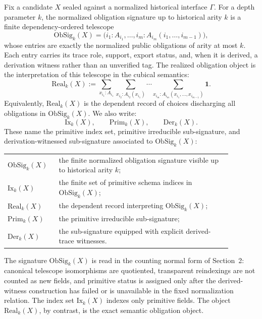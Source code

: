 \documentclass{lmcs}
\begin{document}
\begin{defi}
\label{def:obsig-real}
Fix a candidate \(X\) sealed against a normalized historical interface \(\Gamma\).  For a
depth parameter \(k\), the normalized obligation signature up to historical arity \(k\) is a
finite dependency-ordered telescope
\[
  \mathrm{ObSig}_k(X)
  =
  \bigl(i_1:A_{i_1},\ldots,i_m:A_{i_m}(i_1,\ldots,i_{m-1})\bigr),
\]
whose entries are exactly the normalized public obligations of arity at most \(k\).  Each
entry carries its trace role, support, export status, and, when it is derived, a derivation
witness rather than an unverified tag.  The realized obligation object is the interpretation of
this telescope in the cubical semantics:
\[
  \mathrm{Real}_k(X)
  :=
  \sum_{x_{i_1}:A_{i_1}}
  \sum_{x_{i_2}:A_{i_2}(x_{i_1})}
  \cdots
  \sum_{x_{i_m}:A_{i_m}(x_{i_1},\ldots,x_{i_{m-1}})}
  \mathbf{1}.
\]
Equivalently, \(\mathrm{Real}_k(X)\) is the dependent record of choices discharging all
obligations in \(\mathrm{ObSig}_k(X)\).  We also write:
\[
  \mathrm{Ix}_k(X),\qquad
  \mathrm{Prim}_k(X),\qquad
  \mathrm{Der}_k(X).
\]
These name the primitive index set, primitive irreducible sub-signature, and
derivation-witnessed sub-signature associated to \(\mathrm{ObSig}_k(X)\):
\begin{center}
\begin{tabular}{p{0.18\linewidth}p{0.70\linewidth}}
\hline
\(\mathrm{ObSig}_k(X)\) & the finite normalized obligation signature visible up to
historical arity \(k\); \\
\(\mathrm{Ix}_k(X)\) & the finite set of primitive schema indices in
\(\mathrm{ObSig}_k(X)\); \\
\(\mathrm{Real}_k(X)\) & the dependent record interpreting \(\mathrm{ObSig}_k(X)\); \\
\(\mathrm{Prim}_k(X)\) & the primitive irreducible sub-signature; \\
\(\mathrm{Der}_k(X)\) & the sub-signature equipped with explicit derived-trace witnesses. \\
\hline
\end{tabular}
\end{center}
The signature \(\mathrm{ObSig}_k(X)\) is read in the counting normal form of
Section~2: canonical telescope isomorphisms are quotiented, transparent reindexings are not
counted as new fields, and primitive status is assigned only after the derived-witness
construction has failed or is unavailable in the fixed normalization relation.  The index set
\(\mathrm{Ix}_k(X)\) indexes only primitive fields.  The object \(\mathrm{Real}_k(X)\), by
contrast, is the exact semantic obligation object.
\end{defi}
\end{document}
